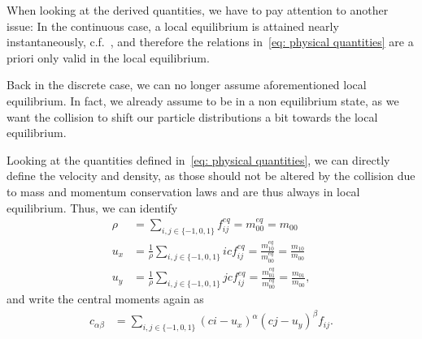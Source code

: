 When looking at the derived quantities, we have to pay attention to another issue:
In the continuous case, a local equilibrium is attained nearly instantaneously, c.f.~\cite[page 218]{smits2000physical}, and therefore the relations in~\eqref{eq: physical quantities} are a priori only valid in the local equilibrium.

Back in the discrete case, we can no longer assume aforementioned local equilibrium.
In fact, we already assume to be in a non equilibrium state, as we want the collision to shift our particle distributions a bit towards the local equilibrium.

Looking at the quantities defined in~\eqref{eq: physical quantities}, we can directly define the velocity and density, as those should not be altered by the collision due to mass and momentum conservation laws and are thus always in local equilibrium.
Thus, we can identify
\begin{align}
  \rho & = \sum_{i,j \in \{-1,0,1\}} f_{ij}^{eq} = m_{00}^{eq} = m_{00}
  \label{eq: density definition}\\
  u_x  & = \frac{1}{\rho} \sum_{i,j \in \{-1,0,1\}} ic f_{ij}^{eq} = \frac{m_{10}^{eq}}{m_{00}^{eq}} = \frac{m_{10}}{m_{00}}
  \label{eq: x velocity definition}\\
  u_y  & = \frac{1}{\rho} \sum_{i,j \in \{-1,0,1\}} jc f_{ij}^{eq} = \frac{m_{01}^{eq}}{m_{00}^{eq}} = \frac{m_{01}}{m_{00}},
  \label{eq: y velocity definition}
\end{align}
and write the central moments again as
\begin{align}
  c_{\alpha\beta} &= \sum_{i,j \in \{-1,0,1\}}
  {\left(ci - u_x\right)}^\alpha
  {\left(cj - u_y\right)}^\beta f_{ij}.
  \label{eq: central moment definition velocities}
\end{align}

